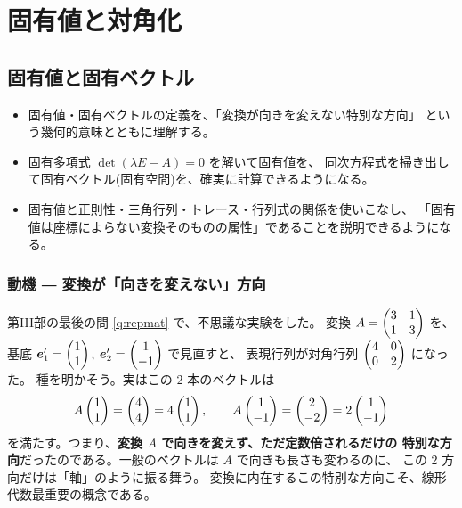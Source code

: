 \part{固有値と対角化}

\chapter{固有値と固有ベクトル}\label{chap:eigen}

\begin{goal}
\begin{itemize}
\item 固有値・固有ベクトルの定義を、「変換が向きを変えない特別な方向」
という幾何的意味とともに理解する。
\item 固有多項式 $\det(\lambda E - A) = 0$ を解いて固有値を、
同次方程式を掃き出して固有ベクトル(固有空間)を、確実に計算できるようになる。
\item 固有値と正則性・三角行列・トレース・行列式の関係を使いこなし、
「固有値は座標によらない変換そのものの属性」であることを説明できるようになる。
\end{itemize}
\end{goal}

\section{動機 ― 変換が「向きを変えない」方向}

第III部の最後の問 \ref{q:repmat} で、不思議な実験をした。
変換 $A = \begin{pmatrix}3 & 1 \\ 1 & 3\end{pmatrix}$ を、基底
$\bm{e}'_1 = \begin{pmatrix}1 \\ 1\end{pmatrix}$, $\bm{e}'_2 = \begin{pmatrix}1 \\ -1\end{pmatrix}$ で見直すと、
表現行列が対角行列 $\begin{pmatrix}4 & 0 \\ 0 & 2\end{pmatrix}$ になった。
種を明かそう。実はこの $2$ 本のベクトルは
\[
A\begin{pmatrix}1 \\ 1\end{pmatrix} = \begin{pmatrix}4 \\ 4\end{pmatrix} = 4\begin{pmatrix}1 \\ 1\end{pmatrix},
\qquad
A\begin{pmatrix}1 \\ -1\end{pmatrix} = \begin{pmatrix}2 \\ -2\end{pmatrix} = 2\begin{pmatrix}1 \\ -1\end{pmatrix}
\]
を満たす。つまり、\textbf{変換 $A$ で向きを変えず、ただ定数倍されるだけの
特別な方向}だったのである。一般のベクトルは $A$ で向きも長さも変わるのに、
この $2$ 方向だけは「軸」のように振る舞う。
変換に内在するこの特別な方向こそ、線形代数最重要の概念である。

